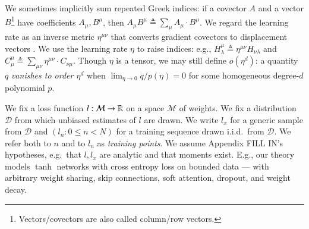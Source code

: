 \documentclass{article}
\theoremstyle{plain}
\theoremstyle{definition}
\newcommand{\Dd}{\mathcal{D}}
\newcommand{\Mm}{\mathcal{M}}
\begin{document}

        We sometimes implicitly sum repeated Greek indices: if a covector $A$
        and a vector $B$\footnote{
            Vectors/covectors are also called column/row vectors.
        } have coefficients $A_\mu, B^\mu$, then 
        $
            A_\mu B^\mu
            \triangleq
            \sum_\mu A_\mu \cdot B^\mu
        $.
        We regard the learning rate as an
        inverse metric $\eta^{\mu\nu}$ that converts gradient covectors to
        displacement vectors \citep{bo13}.  We use the learning rate
        $\eta$ to raise indices: e.g.,
        $
            H^{\mu}_{\lambda}
            \triangleq
            \eta^{\mu\nu} H_{\nu\lambda}
        $ and
        $
            C^{\mu}_{\mu}
            \triangleq
            \sum_{\mu \nu} \eta^{\mu\nu} \cdot C_{\nu\mu}
        $.
        Though $\eta$ is a tensor, we may still define $o(\eta^d)$: a quantity
        $q$ \emph{vanishes to order $\eta^d$} when $\lim_{\eta\to 0} q/p(\eta)
        = 0$ for some homogeneous degree-$d$ polynomial $p$.




        We fix a loss function $l:\Mm\to\RR$ on a space $\Mm$ of weights.  We
        fix a distribution $\Dd$ from which unbiased estimates of $l$ are
        drawn.  We write $l_x$ for a generic sample from $\Dd$ and $(l_n: 0\leq
        n<N)$ for a training sequence drawn i.i.d.\ from $\Dd$.  We refer both
        to $n$ and to $l_n$ as \emph{training points}.  We assume Appendix
        {\color{red} FILL IN}'s hypotheses, e.g.\ that $l, l_x$ are
        analytic and that moments exist.
        E.g., our theory models $\tanh$ networks with cross entropy loss on
        bounded data --- with arbitrary weight sharing, skip connections, soft
        attention, dropout, and weight decay.
        
\end{document}
